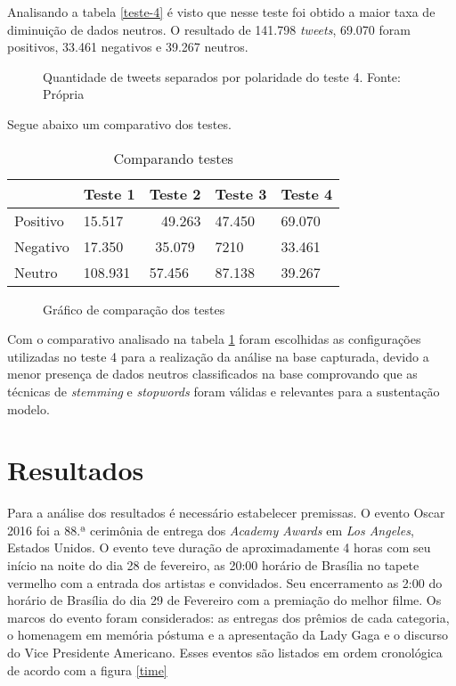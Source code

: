 Analisando a tabela \ref{teste-4} é visto que nesse teste foi obtido a maior taxa de diminuição de dados neutros. O resultado de 141.798 \textit{tweets}, 69.070 foram positivos, 33.461 negativos e 39.267 neutros.


\begin{figure}[H]
	\centering{}
	\caption{Quantidade de tweets separados por polaridade do teste 4. Fonte: Própria}
	\label{teste-graf-4}
\end{figure}

Segue abaixo um comparativo dos testes.

\begin{table}[H]		
	\centering
	\caption{Comparando testes}
	\label{teste-comp}
	\begin{tabular}{l|l|c|l|l|}
		\cline{2-5}
		\multicolumn{1}{c|}{} & \multicolumn{1}{c|}{Teste 1} & Teste 2 & \multicolumn{1}{c|}{Teste 3} & \multicolumn{1}{c|}{Teste 4} \\ \hline
		\multicolumn{1}{|l|}{Positivo} & 15.517 & \multicolumn{1}{r|}{49.263} & 47.450 & 69.070 \\ \hline
		\multicolumn{1}{|l|}{Negativo} & 17.350 & 35.079 & 7210 & 33.461 \\ \hline
		\multicolumn{1}{|l|}{Neutro} & 108.931 & \multicolumn{1}{l|}{57.456} & 87.138 & 39.267 \\ \hline
	
	\end{tabular}
\end{table}

\begin{figure}[H]
	\centering{}
	\caption{Gráfico de comparação dos testes}
	\label{teste-graf-comp}
\end{figure}


Com o comparativo analisado na tabela \ref{teste-comp} foram escolhidas as configurações utilizadas no teste 4 para a realização da análise na base capturada, devido a menor presença de dados neutros classificados na base comprovando que as técnicas de \textit{stemming} e \textit{stopwords} foram válidas e relevantes para a sustentação modelo.

\section{Resultados}\label{result}

Para a análise dos resultados é necessário estabelecer premissas. O evento Oscar 2016 foi a  88.ª cerimônia de entrega dos \textit{Academy Awards} em \textit{Los Angeles}, Estados Unidos. O evento teve duração de aproximadamente 4 horas com seu início na noite do dia 28 de fevereiro, as 20:00 horário de Brasília no tapete vermelho com a entrada dos artistas e convidados. Seu encerramento as 2:00 do horário de Brasília do dia 29 de Fevereiro com a premiação do melhor filme. Os marcos do evento foram considerados: as entregas dos prêmios de cada categoria, o homenagem em memória póstuma e a apresentação da Lady Gaga e o discurso do Vice Presidente Americano. Esses eventos  são listados em ordem cronológica de acordo com a figura \ref{time}

